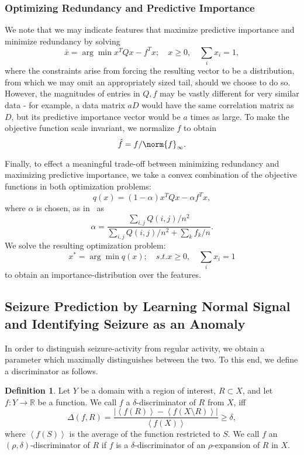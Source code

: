 \documentclass{article} %
\theoremstyle{definition}
\newtheorem{definition}{Definition}[section]
\theoremstyle{remark}
\newcommand{\mean}[1]{\left \langle #1 \right \rangle}
\newcommand{\abs}[1]{\left| #1 \right|}
\newcommand{\rl}{\mathbb{R}}
\renewcommand{\a}{\alpha}
\renewcommand{\d}{\delta}
\begin{document}
\subsubsection{Optimizing Redundancy and Predictive Importance}
We note that we may indicate features that maximize predictive importance and minimize redundancy by solving 
\[ \bar{x} = \arg \min x^T Q x - f^T x; \quad x \geq 0, \quad \sum_i x_i  = 1, \]
where the constraints arise from forcing the resulting vector to be a distribution, from which we may omit an appropriately sized tail, should we choose to do so. However, the magnitudes of entries in $Q, f$ may be vastly different for very similar data - for example, a data matrix $aD$ would have the same correlation matrix as $D$, but its predictive importance vector would be $a$ times as large. To make the objective function scale invariant, we normalize $f$ to obtain
\[ \hat{f} = f/\norm{f}_{\infty}. \]

Finally, to effect a meaningful trade-off between minimizing redundancy and maximizing predictive importance, we take a convex combination of the objective functions in both optimization problems:
\[ q(x) = (1 - \a) x^T Q x - \a  f^T x, \]
where $\a$ is chosen, as in~\cite{quadprog_featsel} as 
\[ \a  = \frac{\sum_{i, j} Q(i, j) /n^2}{\sum_{i, j} Q(i, j)/n^2 + \sum_k f_k / n}. \]
We solve the resulting optimization problem:
\[ x^* = \arg \min q(x); \quad s.t. x \geq 0, \quad \sum_i x_i = 1 \]
to obtain an importance-distribution over the features.

\subsection{Seizure Prediction by Learning Normal Signal and Identifying Seizure as an Anomaly} \label{sec:seizure_predict_method}
In order to distinguish seizure-activity from regular activity, we obtain a parameter which maximally distinguishes between the two. To this end, we define a discriminator as follows.

\begin{definition}
Let $Y$ be a domain with a region of interest, $R \subset X$, and let $f: Y \to \rl$ be a function. We call $f$ a $\d$-discriminator of $R$ from $X$, iff
\[ \Delta(f, R) = \frac{\abs{\mean{f(R)} - \mean{f(X \setminus R)}}}{\mean{f(X)}} \geq \d, \]
where $\mean{f(S)}$ is the average of the function restricted to $S$.
We call $f$ an $(\rho, \delta)$-discriminator of $R$ if $f$ is a $\delta$-discriminator of an $\rho$-expansion of $R$ in $X$.
\end{definition}
\end{document}
